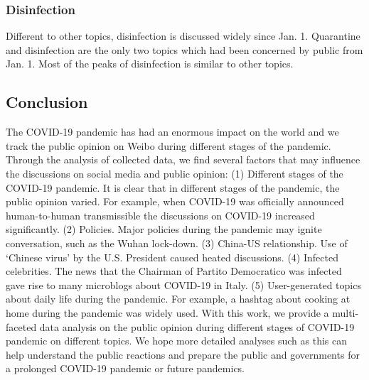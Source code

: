\documentclass[sigconf, nonacm=true]{acmart}
\begin{document}
\subsubsection{Disinfection}
Different to other topics, disinfection is discussed widely since Jan. 1.
Quarantine and disinfection are the only two topics which had been concerned by public from Jan. 1.
Most of the peaks of disinfection is similar to other topics.
\vspace{-0.2cm}
\subsection{Conclusion}
The COVID-19 pandemic has had an enormous impact on the world and we track the public opinion on Weibo during different stages of the pandemic.
Through the analysis of collected data, we find several factors that may influence the discussions on social media and public opinion:
(1) Different stages of the COVID-19 pandemic. It is clear that in different stages of the pandemic, the public opinion varied.
For example, when COVID-19 was officially announced human-to-human transmissible  the discussions on COVID-19 increased significantly.
(2) Policies. Major policies during the pandemic may ignite conversation, such as the Wuhan lock-down.
(3) China-US relationship. Use of `Chinese virus' by the U.S. President caused heated discussions.
(4) Infected celebrities. The news that the Chairman of Partito Democratico was infected gave rise to many microblogs about COVID-19 in Italy.
(5) User-generated topics about daily life during the pandemic. For example, a hashtag about cooking at home during the pandemic was widely used.
With this work, we provide a multi-faceted data analysis on the public opinion during different stages of COVID-19 pandemic on different topics. We hope more detailed analyses such as this can help understand the public reactions and prepare the public and governments for a prolonged COVID-19 pandemic or future pandemics. 





\appendix
\small
\end{document}
